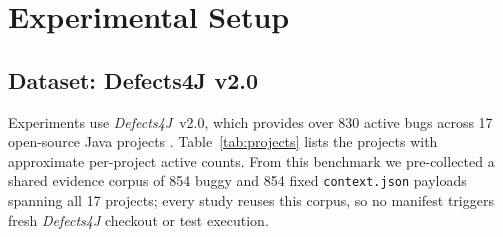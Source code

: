 \section{Experimental Setup}
\label{sec:setup}

\subsection{Dataset: Defects4J v2.0}

Experiments use \textit{Defects4J}~v2.0, which provides over 830 active bugs
across 17 open-source Java projects \citep{just2014defects4j}.
Table~\ref{tab:projects} lists the projects with approximate per-project active
counts. From this benchmark we pre-collected a shared evidence corpus of 854
buggy and 854 fixed \texttt{context.json} payloads spanning all 17 projects; every
study reuses this corpus, so no manifest triggers fresh \textit{Defects4J}
checkout or test execution.

